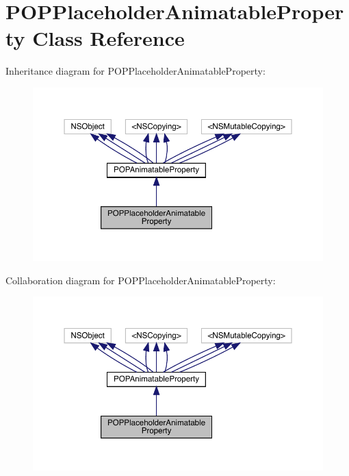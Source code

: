 \hypertarget{interface_p_o_p_placeholder_animatable_property}{}\section{P\+O\+P\+Placeholder\+Animatable\+Property Class Reference}
\label{interface_p_o_p_placeholder_animatable_property}


Inheritance diagram for P\+O\+P\+Placeholder\+Animatable\+Property\+:\nopagebreak
\begin{figure}[H]
\begin{center}
\leavevmode
\includegraphics[width=350pt]{interface_p_o_p_placeholder_animatable_property__inherit__graph}
\end{center}
\end{figure}


Collaboration diagram for P\+O\+P\+Placeholder\+Animatable\+Property\+:\nopagebreak
\begin{figure}[H]
\begin{center}
\leavevmode
\includegraphics[width=350pt]{interface_p_o_p_placeholder_animatable_property__coll__graph}
\end{center}
\end{figure}
